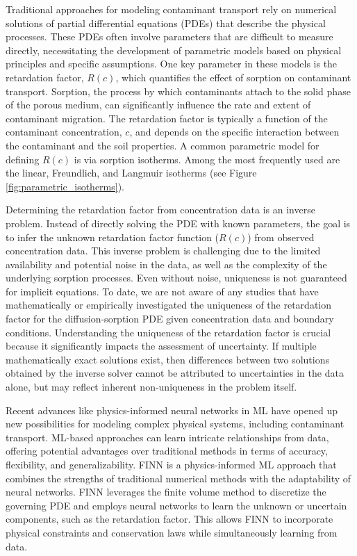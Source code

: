 Traditional approaches for modeling contaminant transport rely on numerical solutions of partial differential equations (PDEs) that describe the physical processes. These PDEs often involve parameters that are difficult to measure directly, necessitating the development of parametric models based on physical principles and specific assumptions.
One key parameter in these models is the retardation factor, $R(c)$, which quantifies the effect of sorption on contaminant transport. Sorption, the process by which contaminants attach to the solid phase of the porous medium, can significantly influence the rate and extent of contaminant migration. The retardation factor is typically a function of the contaminant concentration, $c$, and depends on the specific interaction between the contaminant and the soil properties.
A common parametric model for defining $R(c)$ is via sorption isotherms. Among the most frequently used are the linear, Freundlich, and Langmuir isotherms \cite{finn} (see Figure \vref{fig:parametric_isotherms}).

Determining the retardation factor from concentration data is an inverse problem. Instead of directly solving the PDE with known parameters, the goal is to infer the unknown retardation factor function ($R(c)$) from observed concentration data. This inverse problem is challenging due to the limited availability and potential noise in the data, as well as the complexity of the underlying sorption processes. Even without noise, uniqueness is not guaranteed for implicit equations. To date, we are not aware of any studies that have mathematically or empirically investigated the uniqueness of the retardation factor for the diffusion-sorption PDE given concentration data and boundary conditions. Understanding the uniqueness of the retardation factor is crucial because it significantly impacts the assessment of uncertainty. If multiple mathematically exact solutions exist, then differences between two solutions obtained by the inverse solver cannot be attributed to uncertainties in the data alone, but may reflect inherent non-uniqueness in the problem itself.

Recent advances like physics-informed neural networks in ML have opened up new possibilities for modeling complex physical systems, including contaminant transport. ML-based approaches can learn intricate relationships from data, offering potential advantages over traditional methods in terms of accuracy, flexibility, and generalizability. FINN \cite{finn} is a physics-informed ML approach that combines the strengths of traditional numerical methods with the adaptability of neural networks. FINN leverages the finite volume method to discretize the governing PDE and employs neural networks to learn the unknown or uncertain components, such as the retardation factor. This allows FINN to incorporate physical constraints and conservation laws while simultaneously learning from data.

